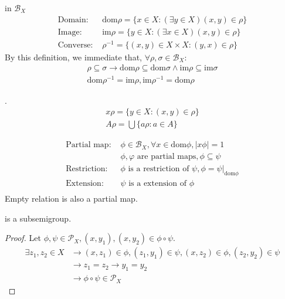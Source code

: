 \begin{Def} in $\mathcal{B}_X$
    \begin{align*}
        \text{Domain: } & \mathrm{dom } \rho=\{x\in X: (\exists y\in X)(x,y)\in \rho\} \\
        \text{Image: } & \mathrm{im } \rho = \{y\in X:(\exists x\in X)(x,y)\in \rho\}  \\
        \text{Converse: } & \rho^{-1}=\{(x,y)\in X\times X: (y,x)\in \rho\}
    \end{align*}
    By this definition, we immediate that, $\forall \rho,\sigma\in \mathcal{B}_X$:
    \begin{align*}
        \rho \subseteq \sigma \rightarrow \mathrm{dom } \rho \subseteq \mathrm{dom }\sigma \wedge \mathrm{im }\rho \subseteq \mathrm{im } \sigma    \\
        \mathrm{dom }\rho^{-1}=\mathrm{im }\rho, \mathrm{im }\rho^{-1}=\mathrm{dom }\rho
    \end{align*}
\end{Def}

\begin{Def}.
    \begin{align*}
        x\rho=\{y\in X: (x,y)\in\rho\}  \\
        A\rho=\bigcup\{a\rho:a\in A\}
    \end{align*}
\end{Def}

\begin{Def}
    \begin{align*}
        \text{Partial map: } &\phi \in \mathcal{B}_X, \forall x\in \mathrm{dom }\phi, |x\phi|=1 \\
        & \phi, \varphi \text{ are partial maps}, \phi \subseteq \psi    \\
        \text{Restriction: } & \phi \text{ is a restriction of } \psi, \phi = \psi|_{\mathrm{dom }\phi}  \\
        \text{Extension: } & \psi \text{ is a extension of } \phi   \\
    \end{align*}
    Empty relation is also a partial map.
\end{Def}

\begin{Prop} is a subsemigroup.
    \begin{proof}
        Let $\phi ,\psi \in \mathcal{P}_X, (x,y_1),(x,y_2)\in \phi \circ \psi $.
        \begin{align*}
            \exists z_1,z_2\in X &\rightarrow (x,z_1) \in \phi ,(z_1,y_1)\in \psi, (x,z_2)\in \phi ,(z_2,y_2)\in \psi    \\
            &\rightarrow z_1=z_2\rightarrow y_1=y_2  \\
            &\rightarrow \phi \circ \psi \in \mathcal{P}_X
        \end{align*}
    \end{proof}
\end{Prop}

